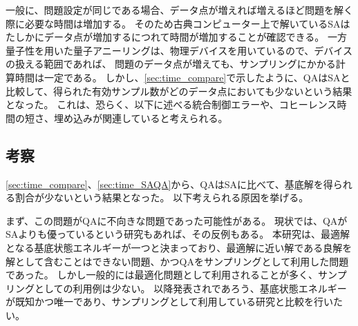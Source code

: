\documentclass[12pt, dvipdfmx]{jmaster}
\theoremstyle{definition}
\begin{document}
一般に、問題設定が同じである場合、データ点が増えれば増えるほど問題を解く際に必要な時間は増加する。
そのため古典コンピューター上で解いているSAはたしかにデータ点が増加するにつれて時間が増加することが確認できる。
一方量子性を用いた量子アニーリングは、物理デバイスを用いているので、デバイスの扱える範囲であれば、
問題のデータ点が増えても、サンプリングにかかる計算時間は一定である。
しかし、\ref{sec:time_compare}で示したように、QAはSAと比較して、得られた有効サンプル数がどのデータ点においても少ないという結果となった。
これは、恐らく、以下に述べる統合制御エラーや、コヒーレンス時間の短さ、埋め込みが関連していると考えられる。

\subsection{考察}
\ref{sec:time_compare}、\ref{sec:time_SAQA}から、QAはSAに比べて、基底解を得られる割合が少ないという結果となった。
以下考えられる原因を挙げる。

まず、この問題がQAに不向きな問題であった可能性がある。
現状では、QAがSAよりも優っているという研究もあれば\cite{denchev2016computational}、その反例もある\cite{ronnow2014defining}。
本研究は、最適解となる基底状態エネルギーが一つと決まっており、最適解に近い解である良解を解として含むことはできない問題、かつQAをサンプリングとして利用した問題であった。
しかし一般的には最適化問題として利用されることが多く、サンプリングとしての利用例は少ない。
以降発表されであろう、基底状態エネルギーが既知かつ唯一であり、サンプリングとして利用している研究と比較を行いたい。
\end{document}
